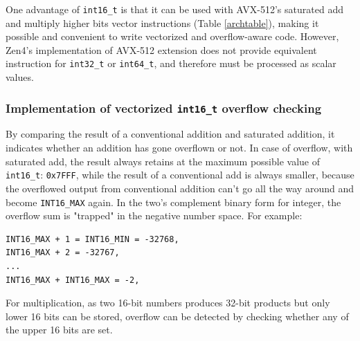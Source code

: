 \documentclass[logo,bsc,singlespacing,parskip]{infthesis}
\begin{document}

One advantage of \texttt{int16\_t} is that it can be used with AVX-512's
saturated add and multiply higher bits vector instructions (Table
\ref{archtable}), making it possible and convenient to write vectorized and
overflow-aware code. However, Zen4's implementation of AVX-512 extension does
not provide equivalent instruction for \texttt{int32\_t} or \texttt{int64\_t},
and therefore must be processed as scalar values.


\subsubsection{Implementation of vectorized \texttt{int16\_t} overflow checking}
By comparing the result of a conventional addition and saturated addition, it
indicates whether an addition has gone overflown or not. In case of overflow,
with saturated add, the result always retains at the maximum possible value of
\texttt{int16\_t}: \texttt{0x7FFF}, while the result of a conventional add is
always smaller, because the overflowed output from conventional addition can't
go all the way around and become \texttt{INT16\_MAX} again. In the two's
complement binary form for integer, the overflow sum is "trapped" in the
negative number space. For example: 
\begin{verbatim}
INT16_MAX + 1 = INT16_MIN = -32768, 
INT16_MAX + 2 = -32767, 
...
INT16_MAX + INT16_MAX = -2, 
\end{verbatim}

For multiplication, as two 16-bit numbers produces 32-bit products but only
lower 16 bits can be stored, overflow can be detected by checking whether any of
the upper 16 bits are set. 
\end{document}
